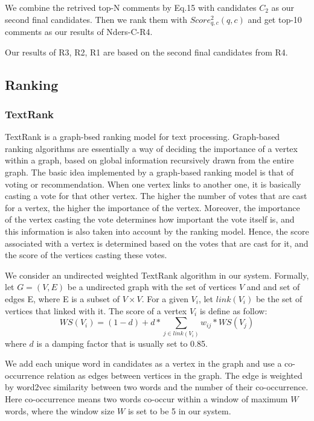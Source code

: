 \documentclass{sig-alternate}
\begin{document}
We combine the retrived top-N comments by Eq.15 with candidates $C_2$ as our 
second final candidates. Then we rank them with $Score_{q,c}^2(q, c)$ and get 
top-10 comments as our results of Nders-C-R4.

Our results of R3, R2, R1 are based on the second final candidates from R4.

\subsection{Ranking}

\subsubsection{TextRank}

TextRank\cite{Mihalcea} is a graph-bsed ranking model for text processing. 
Graph-based ranking algorithms are essentially a
way of deciding the importance of a vertex within
a graph, based on global information recursively
drawn from the entire graph. The basic idea implemented
by a graph-based ranking model is that
of voting or recommendation. When one vertex
links to another one, it is basically casting a vote
for that other vertex. The higher the number of votes
that are cast for a vertex, the higher the importance
of the vertex. Moreover, the importance of the vertex
casting the vote determines how important the vote
itself is, and this information is also taken into account
by the ranking model. Hence, the score associated
with a vertex is determined based on the votes
that are cast for it, and the score of the vertices casting
these votes.

We consider an undirected weighted TextRank algorithm in our system. 
Formally, let $G = (V, E)$ be a undirected graph with the set of vertices $V$ and 
and set of edges E, where E is a subset of $V \times V$. For a given $V_i$, let 
$link(V_i)$ be the set of vertices that linked with it. The score of a vertex 
$V_i$ is define as follow:
\begin{equation}
  WS(V_i) = (1 - d) + d * \sum_{j \in link(V_i)}{w_{ij} * WS(V_j)}
\end{equation}
where $d$ is a damping factor\cite {Brin} that is usually set to 0.85.

We add each unique word in candidates as a vertex in the graph and use a 
co-occurrence relation as edges between vertices in the graph. The edge is 
weighted by word2vec similarity between two words and the number of their 
co-occurrence. Here co-occurrence means two words co-occur within a window of 
maximum $W$ words, where the window size $W$ is set to be 5 in our system.
\end{document}
